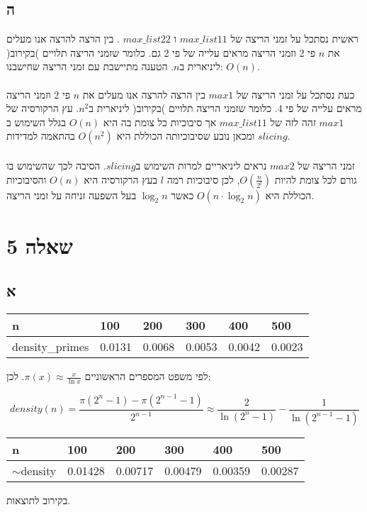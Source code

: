 \documentclass{article}
\begin{document}
\subsection*{ה}

ראשית נסתכל על זמני הריצה של
$max\_list11$
ו
$max\_list22$
.
בין הרצה להרצה אנו מעלים את $n$ פי 2 וזמני הריצה מראים עלייה של פי 2 גם. כלומר שזמני הריצה תלויים )בקירוב( ליניארית ב$n$. הטענה מתיישבת עם זמני הריצה שחישבנו: $O(n)$.
\\
\\
כעת נסתכל על זמני הריצה של
$max1$
בין הרצה להרצה אנו מעלים את $n$ פי 2 וזמני הריצה מראים עלייה של פי 4. כלומר שזמני הריצה תלויים )בקירוב( ליניארית ב$n^2$. עץ הרקורסיה של $max1$ זהה לזה של $max\_list11$ אך סיבוכיות כל צומת בה היא $O(n)$ בגלל השימוש ב$slicing$ ומכאן נובע שסיבוכיותה הכוללת היא $O(n^2)$ בהתאמה למדידות.
\\
\\
זמני הריצה של $max2$ נראים ליניאריים למרות השימוש ב$slicing$. הסיבה לכך שהשימוש בו גורם לכל צומת להיות $O(\frac{n}{2^l})$, לכן סיבוכיות רמה $l$ בעץ הרקורסיה היא $O(n)$ והסיבוכיות הכוללת היא $O(n \cdot \log_2{n})$ כאשר $\log_2{n}$ בעל השפעה זניחה על זמני הריצה.


\section*{שאלה 5}

\subsection*{א}

\begin{center}
  \begin{tabular}{|l|l|l|l|l|l|}
    \hline
    n & 100 & 200 & 300 & 400 & 500 \\ \hline
    density\_primes & 0.0131 & 0.0068 & 0.0053 & 0.0042 & 0.0023 \\ \hline
  \end{tabular}
\end{center}

\vspace{10mm}
לפי משפט המספרים הראשוניים 
$\pi(x) \approx \frac{x}{\ln x}$. לכן:

$$density(n) = \frac{\pi(2^n - 1) - \pi(2^{n-1} - 1)}{2^{n-1}}
\approx \frac{2}{\ln(2^n - 1)} - \frac{1}{\ln(2^{n-1} -1)} $$

\begin{tabular}{|l|l|l|l|l|l|}
  \hline
  n & 100 & 200 & 300 & 400 & 500 \\ \hline
  $\sim$density & 0.01428 & 0.00717 & 0.00479 & 0.00359 & 0.00287 \\ \hline
\end{tabular}
בקירוב לתוצאות.
\end{document}
